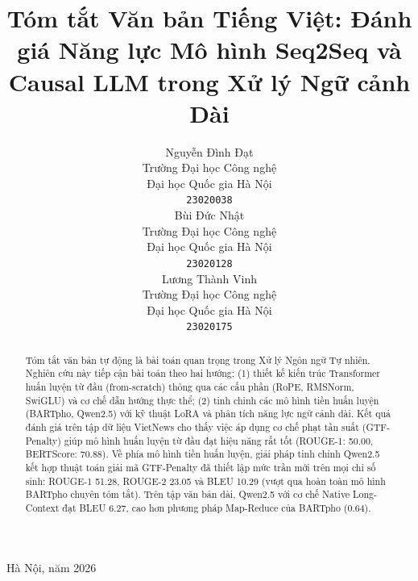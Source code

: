 \documentclass{article}
\begin{document}
\begin{titlepage}
\begin{center}
        \vspace{1.5cm}
        \fontsize{14pt}{0pt}\selectfont Hà Nội, năm 2026
    \end{center}
    
    \restoregeometry
\end{titlepage}

\title{Tóm tắt Văn bản Tiếng Việt: Đánh giá Năng lực Mô hình Seq2Seq và Causal LLM trong Xử lý Ngữ cảnh Dài}

\author{%
  Nguyễn Đình Đạt \\
  Trường Đại học Công nghệ \\
  Đại học Quốc gia Hà Nội \\
  \texttt{23020038} \\
  \And
  Bùi Đức Nhật \\
  Trường Đại học Công nghệ \\
  Đại học Quốc gia Hà Nội \\
  \texttt{23020128} \\
  \And
  Lương Thành Vinh \\
  Trường Đại học Công nghệ \\
  Đại học Quốc gia Hà Nội \\
  \texttt{23020175} \\
}

\maketitle

\begin{abstract}
Tóm tắt văn bản tự động là bài toán quan trọng trong Xử lý Ngôn ngữ Tự nhiên. Nghiên cứu này tiếp cận bài toán theo hai hướng: (1) thiết kế kiến trúc Transformer huấn luyện từ đầu (from-scratch) thông qua các cấu phần (RoPE, RMSNorm, SwiGLU) và cơ chế dẫn hướng thực thể; (2) tinh chỉnh các mô hình tiền huấn luyện (BARTpho, Qwen2.5) với kỹ thuật LoRA và phân tích năng lực ngữ cảnh dài. Kết quả đánh giá trên tập dữ liệu VietNews cho thấy việc áp dụng cơ chế phạt tần suất (GTF-Penalty) giúp mô hình huấn luyện từ đầu đạt hiệu năng rất tốt (ROUGE-1: 50.00, BERTScore: 70.88). Về phía mô hình tiền huấn luyện, giải pháp tinh chỉnh Qwen2.5 kết hợp thuật toán giải mã GTF-Penalty đã thiết lập mức trần mới trên mọi chỉ số sinh: ROUGE-1 51.28, ROUGE-2 23.05 và BLEU 10.29 (vượt qua hoàn toàn mô hình BARTpho chuyên tóm tắt). Trên tập văn bản dài, Qwen2.5 với cơ chế Native Long-Context đạt BLEU 6.27, cao hơn phương pháp Map-Reduce của BARTpho (0.64).
\end{abstract}
\end{document}
